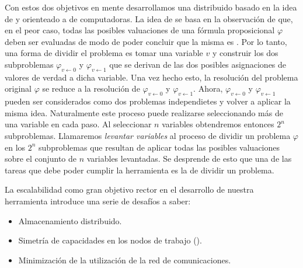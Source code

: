 Con estos dos objetivos en mente desarrollamos una \ssolver distribuido basado
en la idea de \gp y orienteado a \clusters de computadoras. La idea de \gp se
basa en la observación de que, en el peor caso, todas las posibles valuaciones
de una fórmula proposicional $\varphi$ deben ser evaluadas de modo de poder
concluir que la misma es \unsat. Por lo tanto, una forma de dividir el
problema es tomar una variable $v$ y construir los dos subproblemas
$\varphi_{v \leftarrow 0}$ y $\varphi_{v \leftarrow 1}$ que se derivan de las
dos posibles asignaciones de valores de verdad a dicha variable. Una vez hecho
esto, la resolución del problema original $\varphi$ se reduce a la resolución
de $\varphi_{v \leftarrow 0}$ y $\varphi_{v \leftarrow 1}$. Ahora, $\varphi_{v
\leftarrow 0}$ y $\varphi_{v \leftarrow 1}$ pueden ser considerados como dos
problemas independietes y volver a aplicar la misma idea. Naturalmente este
proceso puede realizarse seleccionando más de una variable en cada paso. Al
seleccionar $n$ variables obtendremos entonces $2^n$ subproblemas. Llamaremos
\emph{levantar variables} al proceso de dividir un problema $\varphi$ en los
$2^n$ subproblemas que resultan de aplicar todas las posibles valuaciones
sobre el conjunto de $n$ variables levantadas. Se desprende de esto que una de
las tareas que debe poder cumplir la herramienta es la de dividir un problema.


La escalabilidad como gran objetivo rector en el desarrollo de nuestra
herramienta introduce una serie de desafíos a saber:
\begin{itemize}
	\item Almacenamiento distribuido.
	\item Simetría de capacidades en los nodos de trabajo (\ws).
	\item Minimización de la utilización de la red de comunicaciones.
\end{itemize}

